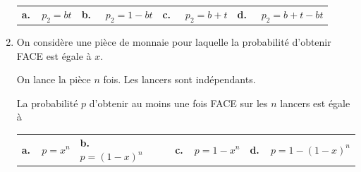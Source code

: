 \begin{enumerate}
\begin{center}
\begin{tabularx}{\linewidth}{*{4}{X}}
\textbf{a.~~}$p_2 = bt$ &\textbf{b.~~} $p_2 = 1 - bt$ &\textbf{c.~~} $p_2 = b + t $&\textbf{d.~~} $p_2 = b + t - bt$
\end{tabularx}
\end{center}
\item On considère une pièce de monnaie pour laquelle la probabilité d'obtenir FACE est égale à $x$.

On lance la pièce $n$ fois. Les lancers sont indépendants.

La probabilité $p$ d'obtenir au moins une fois FACE sur les $n$ lancers est égale à 

\begin{center}
\begin{tabularx}{\linewidth}{*{4}{X}}
\textbf{a.~~}$p = x^n$&\textbf{b.~~} $p = (1 - x)^n$& \textbf{c.~~}$p = 1 - x^n$& \textbf{d.~~}$p = 1 - (1 - x)^n$
\end{tabularx}
\end{center}
\end{enumerate}
